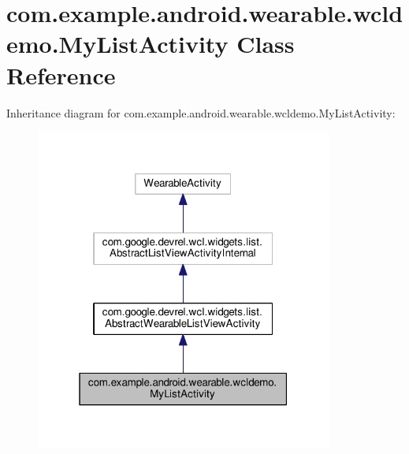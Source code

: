 \hypertarget{classcom_1_1example_1_1android_1_1wearable_1_1wcldemo_1_1MyListActivity}{}\section{com.\+example.\+android.\+wearable.\+wcldemo.\+My\+List\+Activity Class Reference}
\label{classcom_1_1example_1_1android_1_1wearable_1_1wcldemo_1_1MyListActivity}


Inheritance diagram for com.\+example.\+android.\+wearable.\+wcldemo.\+My\+List\+Activity\+:\nopagebreak
\begin{figure}[H]
\begin{center}
\leavevmode
\includegraphics[width=277pt]{d0/d2e/classcom_1_1example_1_1android_1_1wearable_1_1wcldemo_1_1MyListActivity__inherit__graph}
\end{center}
\end{figure}


